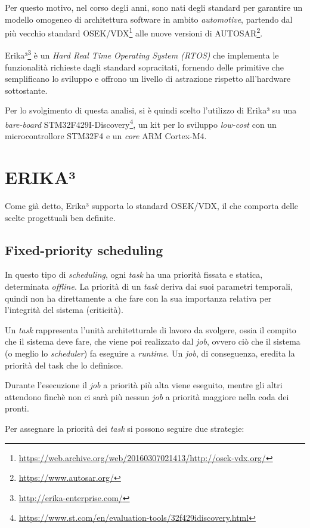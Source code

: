 \documentclass{article}
\begin{document}
Per questo motivo, nel corso degli anni, sono nati degli standard per garantire un modello omogeneo di architettura software in ambito \textit{automotive}, partendo dal più vecchio standard OSEK/VDX\footnote{\url{https://web.archive.org/web/20160307021413/http://osek-vdx.org/}} alle nuove versioni di AUTOSAR\footnote{\url{https://www.autosar.org/}}.

Erika³\footnote{\url{http://erika-enterprise.com/}} è un \textit{Hard Real Time Operating System (RTOS)} che implementa le funzionalità richieste dagli standard sopracitati, fornendo delle primitive che semplificano lo sviluppo e offrono un livello di astrazione rispetto all'hardware sottostante.

Per lo svolgimento di questa analisi, si è quindi scelto l'utilizzo di Erika³ su una \textit{bare-board} STM32F429I-Discovery\footnote{\url{https://www.st.com/en/evaluation-tools/32f429idiscovery.html}}, un kit per lo sviluppo \textit{low-cost} con un microcontrollore STM32F4 e un \textit{core} ARM Cortex-M4.

\section{ERIKA³}
Come già detto, Erika³ supporta lo standard OSEK/VDX, il che comporta delle scelte progettuali ben definite.

\subsection{Fixed-priority scheduling}
In questo tipo di \textit{scheduling}, ogni \textit{task} ha una priorità fissata e statica, determinata \textit{offline}. La priorità di un \textit{task} deriva dai suoi parametri temporali, quindi non ha direttamente a che fare con la sua importanza relativa per l'integrità del sistema (criticità).

Un \textit{task} rappresenta l'unità architetturale di lavoro da svolgere, ossia il compito che il sistema deve fare, che viene poi realizzato dal \textit{job}, ovvero ciò che il sistema (o meglio lo \textit{scheduler}) fa eseguire a \textit{runtime}. Un \textit{job}, di conseguenza, eredita la priorità del task che lo definisce.

Durante l'esecuzione il \textit{job} a priorità più alta viene eseguito, mentre gli altri attendono finchè non ci sarà più nessun \textit{job} a priorità maggiore nella coda dei pronti.

Per assegnare la priorità dei \textit{task} si possono seguire due strategie:
\end{document}
